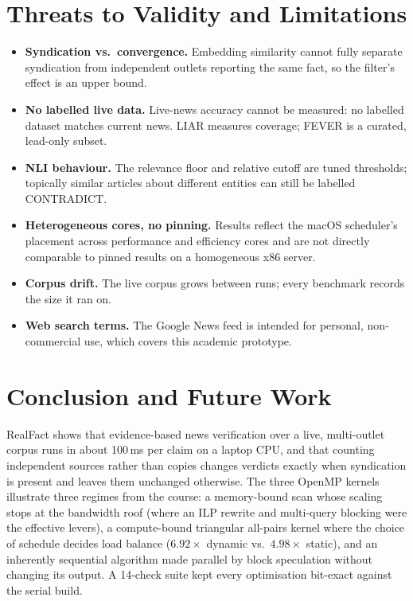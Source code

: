 \documentclass[conference,a4paper]{IEEEtran}
\begin{document}
\section{Threats to Validity and Limitations}
\begin{itemize}
  \item \textbf{Syndication vs.\ convergence.} Embedding similarity cannot fully separate syndication from independent
  outlets reporting the same fact, so the filter's effect is an upper bound.
  \item \textbf{No labelled live data.} Live-news accuracy cannot be measured: no labelled dataset matches current news.
  LIAR measures coverage; FEVER is a curated, lead-only subset.
  \item \textbf{NLI behaviour.} The relevance floor and relative cutoff are tuned thresholds; topically similar
  articles about different entities can still be labelled CONTRADICT.
  \item \textbf{Heterogeneous cores, no pinning.} Results reflect the macOS scheduler's placement across performance
  and efficiency cores and are not directly comparable to pinned results on a homogeneous x86 server.
  \item \textbf{Corpus drift.} The live corpus grows between runs; every benchmark records the size it ran on.
  \item \textbf{Web search terms.} The Google News feed is intended for personal, non-commercial use, which covers this
  academic prototype.
\end{itemize}

\section{Conclusion and Future Work}
RealFact shows that evidence-based news verification over a live, multi-outlet corpus runs in about 100\,ms per claim
on a laptop CPU, and that counting independent sources rather than copies changes verdicts exactly when syndication
is present and leaves them unchanged otherwise. The three OpenMP kernels illustrate three regimes from the course: a
memory-bound scan whose scaling stops at the bandwidth roof (where an ILP rewrite and multi-query blocking were the
effective levers), a compute-bound triangular all-pairs kernel where the choice of schedule decides load balance
($6.92\times$ dynamic vs.\ $4.98\times$ static), and an inherently sequential algorithm made parallel by block
speculation without changing its output. A 14-check suite kept every optimisation bit-exact against the serial build.
\end{document}
